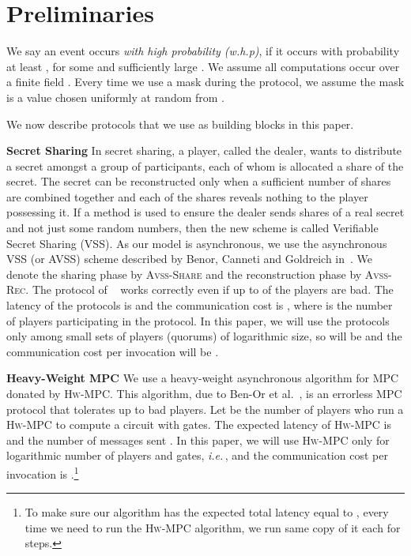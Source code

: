 \documentclass[10pt]{llncs}
\newcommand{\ie}{\emph{i.e.\,}}
\newcommand{\vssSh}{\textsc{Avss-Share}\xspace}
\newcommand{\vssRec}{\textsc{Avss-Rec}\xspace}
\newcommand{\hw}{\textsc{Hw-MPC}\xspace}
\begin{document}
\section{Preliminaries}\label{s:pre}

We say an event occurs \emph{with high probability
  (w.h.p)}, if it occurs with probability at least , for some
 and sufficiently large . We assume all computations occur
over a finite field . Every time we use a mask during the
protocol, we assume the mask is a value chosen uniformly at random
from .

We now describe protocols that we use as building
blocks in this paper.

\smallskip
\noindent
{\bf Secret Sharing} In secret sharing, a player, called the
dealer, wants to distribute a secret amongst a group of participants,
each of whom is allocated a share of the secret. The secret can be
reconstructed only when a sufficient number of shares are combined
together and each of the shares reveals nothing to the player
possessing it. If a method is used to ensure the dealer sends shares
of a real secret and not just some random numbers, then the new scheme
is called Verifiable Secret Sharing (VSS). As our model is
asynchronous, we use the asynchronous VSS (or AVSS) scheme described
by Benor, Canneti and Goldreich
in~\cite{benor_canetti_goldreich:asynchronous}. We denote the sharing
phase by \vssSh and the reconstruction phase by \vssRec. The protocol
of ~\cite{benor_canetti_goldreich:asynchronous} works correctly even
if up to  of the players are bad. The latency of the
protocols is  and the communication cost is , where
 is the number of players participating in the protocol. In this
paper, we will use the protocols only among small sets of players
(quorums) of logarithmic size, so  will be  and the
communication cost per invocation will be .

\smallskip
\noindent
{\bf Heavy-Weight MPC} We use a heavy-weight asynchronous
algorithm for MPC donated by \hw. This algorithm, due to Ben-Or et
al.~\cite{benor_canetti_goldreich:asynchronous}, is an errorless MPC
protocol that tolerates up to  bad players. Let  be the number
of players who run a \hw to compute a circuit with  gates. The
expected latency of \hw is  and the number of messages 
sent . In this paper, we will use \hw only for
logarithmic number of players and gates, \ie,  and the
communication cost per invocation is .\footnote{To make sure 
our algorithm has the expected total latency equal to , 
every time we need to run the \hw algorithm, we run  same 
copy of it each for  steps.}
\end{document}
